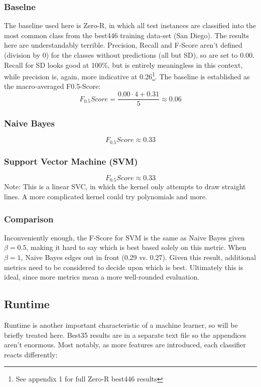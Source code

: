 \documentclass[twocolumn]{article}
\begin{document}
\subsubsection{Baselne}
The baseline used here is Zero-R, in which all test instances are classified into the most common class from the best446 training data-set (San Diego). The results here are understandably terrible. Precision, Recall and F-Score aren't defined (division by 0) for the classes without predictions (all but SD), so are set to 0.00. Recall for SD looks good at 100\%, but is entirely meaningless in this context, while precision is, again, more indicative at 0.26\footnote{See appendix 1 for full Zero-R best446 results}. The baseline is established as the macro-averaged F0.5-Score:
\begin{equation}
F_{0.5}Score = \frac{0.00 \cdot 4 + 0.31}{5} \approx 0.06
\end{equation}

\subsubsection{Naive Bayes}
\begin{equation}
F_{0.5}Score \approx 0.33
\end{equation}
\subsubsection{Support Vector Machine (SVM)}
\begin{equation}
F_{0.5}Score \approx 0.33
\end{equation}
Note: This is a linear SVC, in which the kernel only attempts to draw straight lines. A more complicated kernel could try polynomials and more.

\subsubsection{Comparison}
Inconveniently enough, the F-Score for SVM is the same as Naive Bayes given $\beta = 0.5$, making it hard to say which is best based solely on this metric. When $\beta = 1$, Naive Bayes edges out in front (0.29 vs. 0.27). Given this result, additional metrics need to be considered to decide upon which is best. Ultimately this is ideal, since more metrics mean a more well-rounded evaluation.

\subsection{Runtime}
Runtime is another important characteristic of a machine learner, so will be briefly treated here. Best35 results are in a separate text file so the appendices aren't enormous. Most notably, as more features are introduced, each classifier reacts differently:
\end{document}
